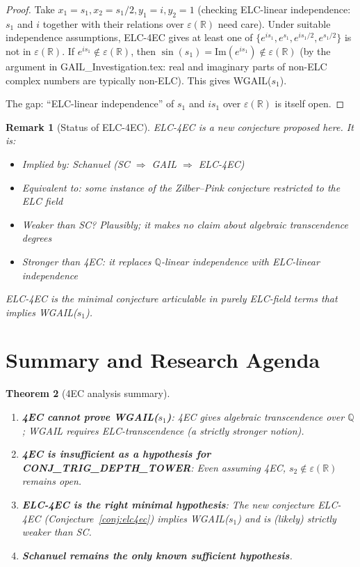 \documentclass[11pt]{article}
\newtheorem{theorem}{Theorem}
\newtheorem{remark}[theorem]{Remark}
\begin{document}
\begin{proof}
Take $x_1 = s_1, x_2 = s_1/2, y_1 = i, y_2 = 1$ (checking ELC-linear independence:
$s_1$ and $i$ together with their relations over $\varepsilon(\mathbb{R})$ need care).
Under suitable independence assumptions, ELC-4EC gives at least one of
$\{e^{is_1}, e^{s_1}, e^{is_1/2}, e^{s_1/2}\}$ is not in $\varepsilon(\mathbb{R})$.
If $e^{is_1} \notin \varepsilon(\mathbb{R})$, then $\sin(s_1) = \mathrm{Im}(e^{is_1}) \notin \varepsilon(\mathbb{R})$
(by the argument in GAIL\_Investigation.tex: real and imaginary parts of non-ELC complex numbers
are typically non-ELC). This gives WGAIL($s_1$).

The gap: ``ELC-linear independence'' of $s_1$ and $is_1$ over $\varepsilon(\mathbb{R})$ is itself open.
\end{proof}

\begin{remark}[Status of ELC-4EC]
ELC-4EC is a new conjecture proposed here. It is:
\begin{itemize}
  \item Implied by: Schanuel (SC $\Rightarrow$ GAIL $\Rightarrow$ ELC-4EC)
  \item Equivalent to: some instance of the Zilber--Pink conjecture restricted to the ELC field
  \item Weaker than SC? Plausibly; it makes no claim about algebraic transcendence degrees
  \item Stronger than 4EC: it replaces $\mathbb{Q}$-linear independence with ELC-linear independence
\end{itemize}
ELC-4EC is the minimal conjecture articulable in purely ELC-field terms that
implies WGAIL($s_1$).
\end{remark}

\section{Summary and Research Agenda}

\begin{theorem}[4EC analysis summary]
\begin{enumerate}
  \item \textbf{4EC cannot prove WGAIL($s_1$)}:
    4EC gives algebraic transcendence over $\mathbb{Q}$;
    WGAIL requires ELC-transcendence (a strictly stronger notion).
  \item \textbf{4EC is insufficient as a hypothesis for CONJ\_TRIG\_DEPTH\_TOWER}:
    Even assuming 4EC, $s_2 \notin \varepsilon(\mathbb{R})$ remains open.
  \item \textbf{ELC-4EC is the right minimal hypothesis}:
    The new conjecture ELC-4EC (Conjecture~\ref{conj:elc4ec}) implies WGAIL($s_1$)
    and is (likely) strictly weaker than SC.
  \item \textbf{Schanuel remains the only known sufficient hypothesis}.
\end{enumerate}
\end{theorem}
\end{document}
